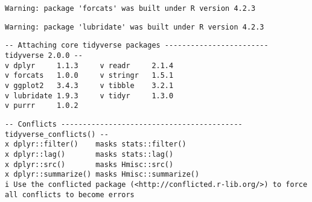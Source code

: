 \documentclass[
  letterpaper,
  DIV=11,
  numbers=noendperiod]{scrartcl}
\begin{document}
\begin{verbatim}
Warning: package 'forcats' was built under R version 4.2.3
\end{verbatim}

\begin{verbatim}
Warning: package 'lubridate' was built under R version 4.2.3
\end{verbatim}

\begin{verbatim}
-- Attaching core tidyverse packages ------------------------ tidyverse 2.0.0 --
v dplyr     1.1.3     v readr     2.1.4
v forcats   1.0.0     v stringr   1.5.1
v ggplot2   3.4.3     v tibble    3.2.1
v lubridate 1.9.3     v tidyr     1.3.0
v purrr     1.0.2     
\end{verbatim}

\begin{verbatim}
-- Conflicts ------------------------------------------ tidyverse_conflicts() --
x dplyr::filter()    masks stats::filter()
x dplyr::lag()       masks stats::lag()
x dplyr::src()       masks Hmisc::src()
x dplyr::summarize() masks Hmisc::summarize()
i Use the conflicted package (<http://conflicted.r-lib.org/>) to force all conflicts to become errors
\end{verbatim}
\end{document}
